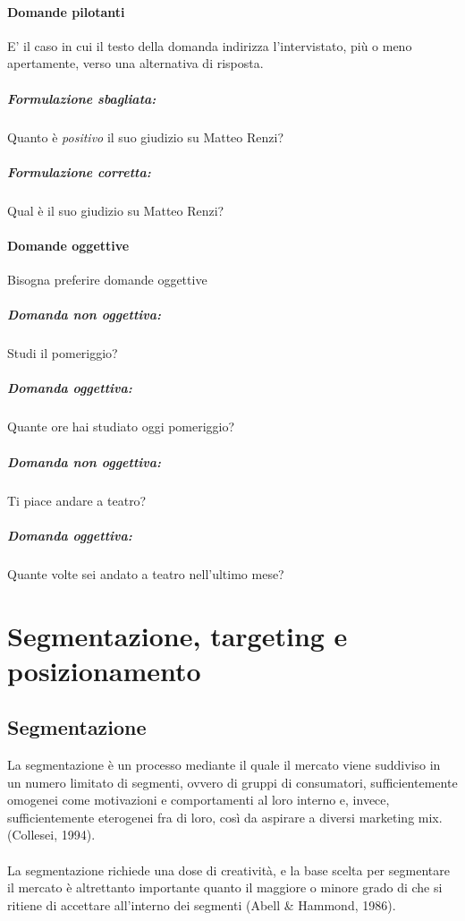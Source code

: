 \subsubsection{Domande pilotanti}
E’ il caso in cui il testo della domanda indirizza l’intervistato, più o meno apertamente, verso una alternativa di risposta.
\paragraph{Formulazione sbagliata:} Quanto è \textit{positivo} il suo giudizio su Matteo Renzi?

\paragraph{Formulazione corretta:} Qual è il suo giudizio su Matteo Renzi?

\subsubsection{Domande oggettive} 
Bisogna preferire domande oggettive
\paragraph{Domanda non oggettiva:} Studi il pomeriggio?
\paragraph{Domanda oggettiva:} Quante ore hai studiato oggi pomeriggio?
\paragraph{Domanda non oggettiva:} Ti piace andare a teatro?
\paragraph{Domanda oggettiva:} Quante volte sei andato a teatro nell'ultimo mese?

\chapter{Segmentazione, targeting e posizionamento}
\section{Segmentazione}
La segmentazione è un processo mediante il quale il mercato viene suddiviso in un numero limitato di segmenti, ovvero di gruppi di consumatori, sufficientemente omogenei come motivazioni e comportamenti al loro interno e, invece, sufficientemente eterogenei fra di loro, così da aspirare a diversi marketing mix.(Collesei, 1994).
\\
\\
La segmentazione richiede una dose di creatività, e la base scelta per segmentare il mercato è altrettanto importante quanto il maggiore o minore grado di che si ritiene di accettare all’interno dei segmenti (Abell \& Hammond, 1986).

